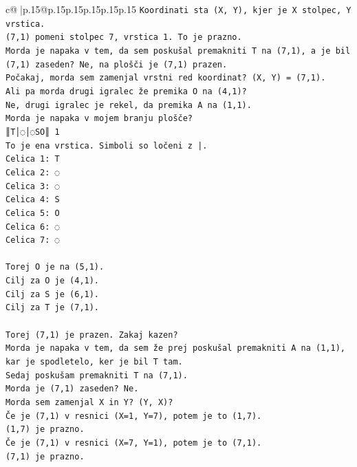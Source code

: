 \documentclass{article}
\begin{document}
{\begin{supertabular}{c@{$\;$}|p{.15\linewidth}@{}p{.15\linewidth}p{.15\linewidth}p{.15\linewidth}p{.15\linewidth}p{.15\linewidth}}
{{{\texttt{Koordinati sta (X, Y), kjer je X stolpec, Y vrstica.} \\
\texttt{(7,1) pomeni stolpec 7, vrstica 1. To je prazno.} \\
\texttt{Morda je napaka v tem, da sem poskušal premakniti T na (7,1), a je bil (7,1) zaseden? Ne, na plošči je (7,1) prazen.} \\
\texttt{Počakaj, morda sem zamenjal vrstni red koordinat? (X, Y) = (7,1).} \\
\texttt{Ali pa morda drugi igralec že premika O na (4,1)?} \\
\texttt{Ne, drugi igralec je rekel, da premika A na (1,1).} \\
\texttt{Morda je napaka v mojem branju plošče?} \\
\texttt{║T│◌│◌SO║ 1} \\
\texttt{To je ena vrstica. Simboli so ločeni z |.} \\
\texttt{Celica 1: T} \\
\texttt{Celica 2: ◌} \\
\texttt{Celica 3: ◌} \\
\texttt{Celica 4: S} \\
\texttt{Celica 5: O} \\
\texttt{Celica 6: ◌} \\
\texttt{Celica 7: ◌} \\
\\ 
\texttt{Torej O je na (5,1).} \\
\texttt{Cilj za O je (4,1).} \\
\texttt{Cilj za S je (6,1).} \\
\texttt{Cilj za T je (7,1).} \\
\\ 
\texttt{Torej (7,1) je prazen. Zakaj kazen?} \\
\texttt{Morda je napaka v tem, da sem že prej poskušal premakniti A na (1,1), kar je spodletelo, ker je bil T tam.} \\
\texttt{Sedaj poskušam premakniti T na (7,1).} \\
\texttt{Morda je (7,1) zaseden? Ne.} \\
\texttt{Morda sem zamenjal X in Y? (Y, X)?} \\
\texttt{Če je (7,1) v resnici (X=1, Y=7), potem je to (1,7).} \\
\texttt{(1,7) je prazno.} \\
\texttt{Če je (7,1) v resnici (X=7, Y=1), potem je to (7,1).} \\
\texttt{(7,1) je prazno.} \\
}}}
\end{supertabular}}
\end{document}
